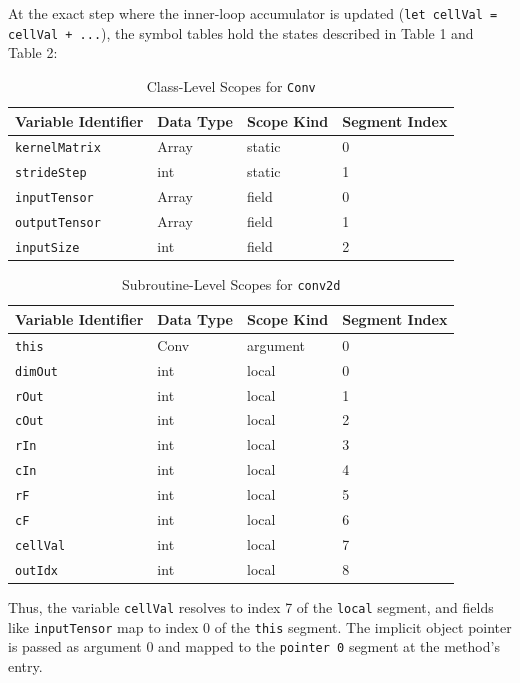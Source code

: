 \documentclass[11pt,a4paper]{article}
\begin{document}
At the exact step where the inner-loop accumulator is updated (\texttt{let cellVal = cellVal + ...}), the symbol tables hold the states described in Table 1 and Table 2:

\begin{table}[h!]
\centering
\caption{Class-Level Scopes for \texttt{Conv}}
\begin{tabular}{@{}llll@{}}
\toprule
\textbf{Variable Identifier} & \textbf{Data Type} & \textbf{Scope Kind} & \textbf{Segment Index} \\
\midrule
\texttt{kernelMatrix} & Array & static & 0 \\
\texttt{strideStep} & int & static & 1 \\
\texttt{inputTensor} & Array & field & 0 \\
\texttt{outputTensor} & Array & field & 1 \\
\texttt{inputSize} & int & field & 2 \\
\bottomrule
\end{tabular}
\end{table}

\begin{table}[h!]
\centering
\caption{Subroutine-Level Scopes for \texttt{conv2d}}
\begin{tabular}{@{}llll@{}}
\toprule
\textbf{Variable Identifier} & \textbf{Data Type} & \textbf{Scope Kind} & \textbf{Segment Index} \\
\midrule
\texttt{this} & Conv & argument & 0 \\
\texttt{dimOut} & int & local & 0 \\
\texttt{rOut} & int & local & 1 \\
\texttt{cOut} & int & local & 2 \\
\texttt{rIn} & int & local & 3 \\
\texttt{cIn} & int & local & 4 \\
\texttt{rF} & int & local & 5 \\
\texttt{cF} & int & local & 6 \\
\texttt{cellVal} & int & local & 7 \\
\texttt{outIdx} & int & local & 8 \\
\bottomrule
\end{tabular}
\end{table}

Thus, the variable \texttt{cellVal} resolves to index 7 of the \texttt{local} segment, and fields like \texttt{inputTensor} map to index 0 of the \texttt{this} segment. The implicit object pointer is passed as argument 0 and mapped to the \texttt{pointer 0} segment at the method's entry.
\end{document}

